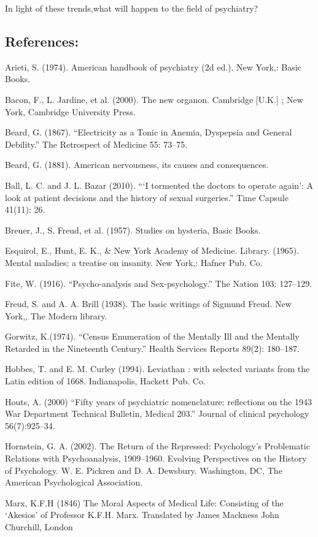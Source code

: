 In light of these trends,what will happen to the field of psychiatry?

\subsection{References:}
\label{references:}

Arieti, S. (1974). American handbook of psychiatry (2d ed.). New York,: Basic Books.

Bacon, F., L. Jardine, et al. (2000). The new organon. Cambridge [U.K.] ; New York, Cambridge University Press.

Beard, G. (1867). ``Electricity as a Tonic in Anemia, Dyspepsia and General Debility.'' The Retrospect of Medicine 55: 73--75.

Beard, G. (1881). American nervousness, its causes and consequences. 

Ball, L. C. and J. L. Bazar (2010). ```I tormented the doctors to operate again': A look at patient decisions and the history of sexual surgeries.'' Time Capsule 41(11): 26.

Breuer, J., S. Freud, et al. (1957). Studies on hysteria, Basic Books.

Esquirol, E., Hunt, E. K., \& New York Academy of Medicine. Library. (1965). Mental maladies; a treatise on insanity. New York,: Hafner Pub. Co.

Fite, W. (1916). ``Psycho-analysis and Sex-psychology.'' The Nation 103: 127--129.

Freud, S. and A. A. Brill (1938). The basic writings of Sigmund Freud. New York,, The Modern library.

Gorwitz, K.(1974). “Census Enumeration of the Mentally Ill and the Mentally Retarded in the Nineteenth Century.” Health Services Reports 89(2): 180--187.

Hobbes, T. and E. M. Curley (1994). Leviathan : with selected variants from the Latin edition of 1668. Indianapolis, Hackett Pub. Co.

Houts, A. (2000) “Fifty years of psychiatric nomenclature: reflections on the 1943 War Department Technical Bulletin, Medical 203.” Journal of clinical psychology 56(7):925--34.

Hornstein, G. A. (2002). The Return of the Repressed: Psychology's Problematic Relations with Psychoanalysis, 1909--1960. Evolving Perspectives on the History of Psychology. W. E. Pickren and D. A. Dewsbury. Washington, DC, The American Psychological Association.

Marx, K.F.H (1846) The Moral Aspects of Medical Life: Consisting of the `Akesios' of Professor K.F.H. Marx. Translated by James Mackness John Churchill, London

